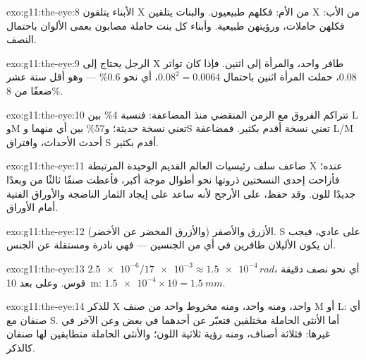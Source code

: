\begin{solution}{exo:g11:the-eye:8}
الأبناء يتلقون  X من الأم: فكلهم طبيعيون. والبنات يتلقين  X
من الأب: فكلهن حاملات، ورؤيتهن طبيعية. وأبناء كل بنت حاملة مصابون
بعمى الألوان باحتمال النصف.
\end{solution}

\begin{solution}{exo:g11:the-eye:9}
الرجل يحتاج إلى  X طافر واحد، والمرأة إلى اثنين. فإذا كان تواتر
 0.08، حملت المرأة اثنين باحتمال $0.08^2 = 0.0064$، أي نحو
0.6\% --- وهو أقل ستة عشر ضعفًا من 8\%.
\end{solution}

\begin{solution}{exo:g11:the-eye:10}
تتراكم الفروق مع الزمن المنقضي منذ المضاعفة: فنسبة 4\% بين L وM تعني نسخة
حديثة؛ و57\% بين أي منهما وS تعني نسخة أقدم بكثير. فمضاعفة L/M أحدث
الأحداث، وافتراق S أقدم بكثير.
\end{solution}

\begin{solution}{exo:g11:the-eye:11}
ضاعف سلف رئيسيات العالم القديم   الوحيدة المرتبطة 
X عنده؛ فأزاحت إحدى النسختين ذروتها نحو أطوال موجة أكبر، فأعطت صنفًا
ثالثًا من  وبعدًا جديدًا للون. وقد حفظ، على الأرجح لأنه ساعد
على إيجاد الثمار الناضجة والأوراق الفتية أمام الأوراق.
\end{solution}

\begin{solution}{exo:g11:the-eye:12}
الأزرق والأصفر (والأزرق المخضر عن الأخضر).  S على  عادي،
فيجب أن يكون الأليلان طافرين في أي من الجنسين --- فهي نادرة ومستقلة عن
الجنس.
\end{solution}

\begin{solution}{exo:g11:the-eye:13}
$\num{2.5e-6}/\num{17e-3} \approx \num{1.5e-4}\,\unit{rad}$، أي نحو
نصف دقيقة قوس. وعلى بعد \qty{10}{m}: $\num{1.5e-4} \times 10 =
\qty{1.5}{mm}$.
\end{solution}

\begin{solution}{exo:g11:the-eye:14}
للذكر  X واحد، ومنه  واحد، ومنه مخروط واحد من صنف M أو L: أي
صنفان مع S. أما الأنثى الحاملة  مختلفين فتعبّر عن أحدهما في بعض
 وعن الآخر في غيرها: فثلاثة أصناف، ومنه رؤية ثلاثية اللون؛
والأنثى الحاملة  متطابقين لها صنفان كالذكر.
\end{solution}


